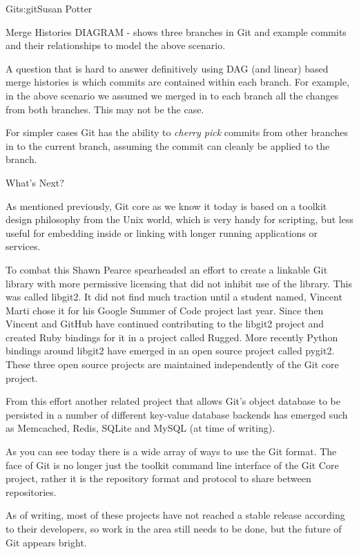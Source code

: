 \begin{aosachapter}{Git}{s:git}{Susan Potter}
\begin{aosasect1}{Merge Histories}
DIAGRAM - shows three branches in Git and example commits and their
relationships to model the above scenario.

A question that is hard to answer definitively using DAG (and linear) based
merge histories is which commits are contained within each branch. For
example, in the above scenario we assumed we merged in to each branch all
the changes from both branches. This may not be the case.

For simpler cases Git has the ability to \emph{cherry pick} commits from
other branches in to the current branch, assuming the commit can cleanly
be applied to the branch.

\end{aosasect1}

\begin{aosasect1}{What's Next?}

As mentioned previously, Git core as we know it today is based on a toolkit
design philosophy from the Unix world, which is very handy for scripting,
but less useful for embedding inside or linking with longer running
applications or services.

To combat this Shawn Pearce spearheaded an effort to create a linkable Git
library with more permissive licensing that did not inhibit use of the
library. This was called libgit2. It did not find much traction until a
student named, Vincent Marti chose it for his Google Summer of Code project
last year. Since then Vincent and GitHub have continued contributing to the
libgit2 project and created Ruby bindings for it in a project called Rugged.
More recently Python bindings around libgit2 have emerged in an open source
project called pygit2. These three open source projects are maintained
independently of the Git core project.

From this effort another related project that allows Git's object database
to be persisted in a number of different key-value database backends has
emerged such as Memcached, Redis, SQLite and MySQL (at time of writing).

As you can see today there is a wide array of ways to use the Git format.
The face of Git is no longer just the toolkit command line interface of
the Git Core project, rather it is the repository format and protocol to
share between repositories.

As of writing, most of these projects have not reached a stable release
according to their developers, so work in the area still needs to be done,
but the future of Git appears bright.


\end{aosasect1}
\end{aosachapter}
